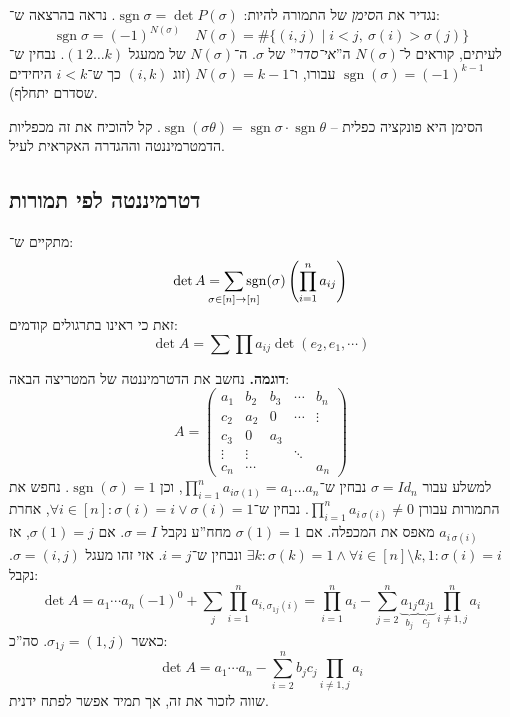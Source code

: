 \documentclass[]{article}
\DeclareMathOperator{\sgn}    {sgn}
\newcommand\co        {\colon}
\newcommand\pms[1]    {\begin{pmatrix}
        #1
\end{pmatrix}}
\newcommand\tg        {\theta}
\newcommand\sg        {\sigma}
\newcommand\cl [1]    {\left ( #1 \right )}
\theoremstyle{definition}
\begin{document}
    נגדיר את ה\textit{סימן} של התמורה להיות: $\sgn\sg = \det P(\sg)$. נראה בהרצאה ש־: 
    \[ \sgn \sg = (-1)^{N(\sg)} \quad N(\sg) = \#{\{(i, j) \mid i< j, \ \sg(i) > \sg(j)\}} \]
    לעיתים, קוראים ל־$N(\sg)$ ה''\textit{אי־סדר}'' של $\sg$. ה־$N(\sg)$ של ממעגל $(1\,2 \dots k)$. נבחין ש־$\sgn(\sg) = (-1)^{k - 1}$ עבורו, ו־$N(\sg) = k - 1$ (זוג $(i, k)$ כך ש־$i < k$ היחידים שסדרם יתחלף). 
    
    הסימן היא פונקציה כפלית – $\sgn(\sg\tg) = \sgn \sg \cdot \sgn \tg$. קל להוכיח את זה מכפליות הדמטרמיננטה וההגדרה האקראית לעיל. 
    
    \subsection{דטרמיננטה לפי תמורות}
    מתקיים ש־: 
    \[ \det A = \sum_{\mathclap{\sg \in [n] \to [n]}} \sgn (\sg )\cl{\prod_{i = 1}^{n}a_{ij}} \]
    זאת כי ראינו בתרגולים קודמים: 
    \[ \det A = \sum \prod a_{ij}\det(e_2, e_1, \cdots) \]
    
    \textbf{דוגמה. }נחשב את הדטרמיננטה של המטריצה הבאה: 
    \[ A = \pms{a_1 & b_2 & b_3 & \cdots & b_n\\ c_2 & a_2 & 0 &\cdots & \vdots  \\ c_3 & 0 & a_3 \\ \vdots & \vdots && \ddots \\ c_n & \cdots & && a_n } \]
    למשלע עבור $\sg = Id_n$ נבחין ש־$\prod_{i = 1}^n a_{i\sg(1)} = a_1 \dots a_n$, וכן $\sgn(\sg) = 1$. נחפש את התמורות עבורן $\prod_{i = 1}^{n} a_{i \, \sg(i)} \neq 0$. נבחין ש־$\forall i \in [n] \co \sg(i) = i \lor \sg(i) = 1$, אחרת $a_{i\, \sg(i)}$ מאפס את המכפלה. אם $\sg(1) = 1$ מחח''ע נקבל $\sg = I$. אם $\sg(1) = j$, אז $\exists k \co \sg(k) = 1 \land \forall i \in [n]\setminus{k, 1} \co \sg(i) = i$ ונבחין ש־$i = j$. אזי זהו מעגל $\sg = (i, j)$. נקבל: 
    \[ \det A = a_1 \cdots a_n (-1)^{0} + \sum_{j} {\prod_{i = 1}^{n}a_{i, \sg_{1j}(i)}} = \prod_{i = 1}^{n}a_{i} - \sum_{j = 2}^{n}\underbrace{a_{1j}}_{b_j}\underbrace{a_{j1}}_{c_j}\prod_{i\neq 1, j}^{n}a_{i} \]
    כאשר $\sg_{1j} = (1, j)$. 
    סה''כ: 
    \[ \det A = a_1 \cdots a_n - \sum_{i = 2}^{n} b_j c_j \prod_{i \neq 1, j} a_i \]
    שווה לזכור את זה, אך תמיד אפשר לפתח ידנית. 
\end{document}
